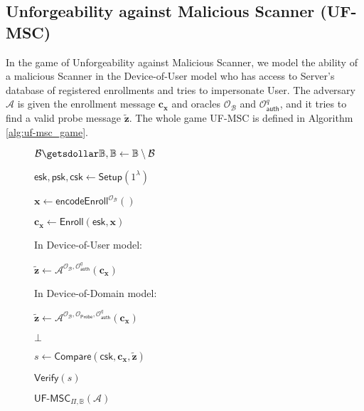 \iffalse


\subsection{Unforgeability against Malicious Scanner (UF-MSC)}
\label{sec:uf-msc_game}

In the game of Unforgeability against Malicious Scanner, we model the ability of a malicious \textsf{Scanner} in the Device-of-User model who has access to \textsf{Server}'s database of registered enrollments and tries to impersonate \textsf{User}. The adversary $\mathcal{A}$ is given the enrollment message $\mathbf{c_x}$ and oracles $\mathcal{O}_{\mathcal{B}}$ and $\mathcal{O}_\textsf{auth}^q$, and it tries to find a valid probe message $\mathbf{\tilde{z}}$. The whole game \textsf{UF-MSC} is defined in Algorithm \ref{alg:uf-msc_game}.

\begin{figure}[h]
\centering
	\begin{minipage}[t]{0.6\linewidth}
	\centering
	\begin{algorithm}[H]
	\caption{$\textsf{UF-MSC}_{\Pi, \mathbb{B}}(\mathcal{A})$}
	\label{alg:uf-msc_game}
	\begin{algorithmic}[1]
		\State $\mathcal{B} \getsdollar \mathbb{B}, \mathbb{B} \gets \mathbb{B} \setminus \mathcal{B}$

		\State $\textsf{esk}, \textsf{psk}, \textsf{csk} \gets \textsf{Setup}(1^\lambda)$

		\State $\mathbf{x} \gets \textsf{encodeEnroll}^{\mathcal{O}_{\mathcal{B}}}()$

		\State $\mathbf{c_x} \gets \textsf{Enroll}(\textsf{esk}, \mathbf{x})$
		
		\State In Device-of-User model:
		
		\State \hspace{\algorithmicindent} ${\mathbf{\tilde{z}}} \gets \mathcal{A}^{ \mathcal{O}_{\mathcal{B}}, \mathcal{O}_\textsf{auth}^q } ( \mathbf{c_x} )$

		\State In Device-of-Domain model:
		
		\State \hspace{\algorithmicindent} ${\mathbf{\tilde{z}}} \gets \mathcal{A}^{ \mathcal{O}_{\mathcal{B}}, \mathcal{O}_\textsf{Probe}, \mathcal{O}_\textsf{auth}^q } ( \mathbf{c_x} )$
		
		
		\State \Return $\bot$
		
		\EndIf
		\State $s \gets \textsf{Compare}( \textsf{csk}, \mathbf{c_x}, \mathbf{\tilde{z}} )$

		\State \Return $\textsf{Verify}(s)$
	\end{algorithmic}
	\end{algorithm}
	\end{minipage}
	
\label{fig:uf-msc_game}
\end{figure}


